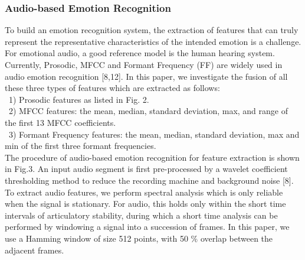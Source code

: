\documentclass[journal]{IEEEtran}
\begin{document}
\subsubsection{Audio-based Emotion Recognition}
To build an emotion recognition system, the extraction of features that can truly represent the representative characteristics of the intended emotion is a challenge. For emotional audio, a good reference model is the human hearing system. Currently, Prosodic, MFCC and Formant Frequency (FF) are widely used in audio emotion recognition [8,12]. In this paper, we investigate the fusion of all these three types of features which are extracted as follows:\\\ 1)	Prosodic features as listed in Fig. 2.\\\ 2)	MFCC features: the mean, median, standard deviation, max, and range of the first 13 MFCC coefficients.\\\ 3)	Formant Frequency features: the mean, median, standard deviation, max and min of the first three formant frequencies.\\\indent The procedure of audio-based emotion recognition for feature extraction is shown in Fig.3. An input audio segment is first pre-processed by a wavelet coefficient thresholding method to reduce the recording machine and background noise [8]. To extract audio features, we perform spectral analysis which is only reliable when the signal is stationary. For audio, this holds only within the short time intervals of articulatory stability, during which a short time analysis can be performed by windowing a signal into a succession of frames. In this paper, we use a Hamming window of size 512 points, with 50 $ \% $ overlap between the adjacent frames.\\
\end{document}
